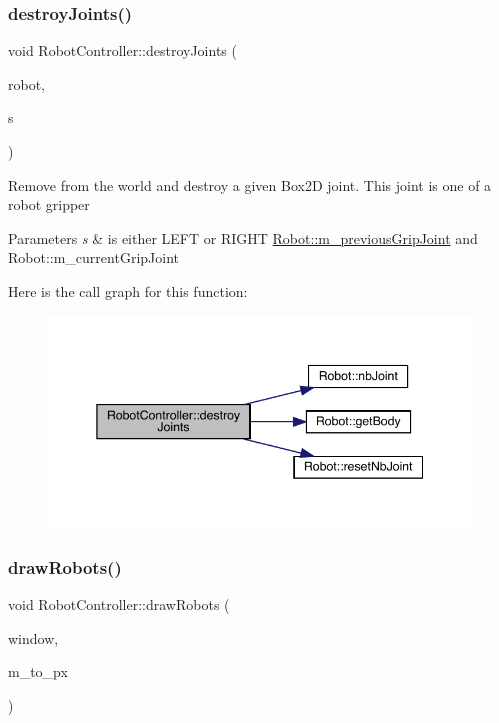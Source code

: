 \subsubsection{\texorpdfstring{destroy\+Joints()}{destroyJoints()}}
{\footnotesize\ttfamily void Robot\+Controller\+::destroy\+Joints (\begin{DoxyParamCaption}\item[{\mbox{\hyperlink{class_robot}{Robot}} \&}]{robot,  }\item[{\mbox{\hyperlink{_robot_8h_afc015eff6557e84151d2e53b94375445}{side}}}]{s }\end{DoxyParamCaption})}

Remove from the world and destroy a given Box2D joint. This joint is one of a robot gripper 
\begin{DoxyParams}{Parameters}
{\em s} & is either L\+E\+FT or R\+I\+G\+HT  \mbox{\hyperlink{class_robot_a35d0d222246bd7084fac5ae5cdf6d3ce}{Robot\+::m\+\_\+previous\+Grip\+Joint}} and Robot\+::m\+\_\+current\+Grip\+Joint \\
\hline
\end{DoxyParams}
Here is the call graph for this function\+:\nopagebreak
\begin{figure}[H]
\begin{center}
\leavevmode
\includegraphics[width=345pt]{class_robot_controller_a62fac365f203e2f826efb9b7b7e56854_cgraph}
\end{center}
\end{figure}
\mbox{\label{class_robot_controller_a2d4d4c93aed605c945e7a95876825bdc}} 
\subsubsection{\texorpdfstring{draw\+Robots()}{drawRobots()}}
{\footnotesize\ttfamily void Robot\+Controller\+::draw\+Robots (\begin{DoxyParamCaption}\item[{sf\+::\+Render\+Window \&}]{window,  }\item[{double}]{m\+\_\+to\+\_\+px }\end{DoxyParamCaption})}

